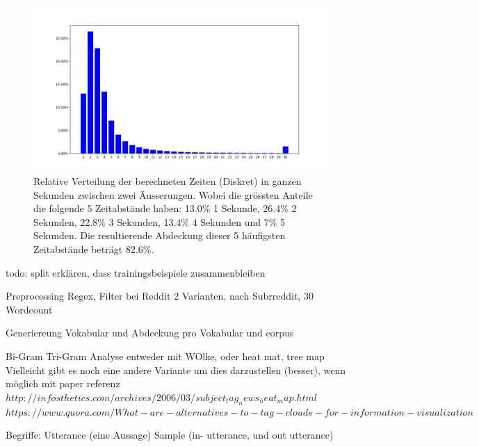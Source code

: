 \begin{figure}[h]
	\label{fig:data:analyse:timediff:opus}
	\centering
	\includegraphics[width=15cm]{img/opus_time_analyze.PNG}
	\caption{Relative Verteilung der berechneten Zeiten (Diskret) in ganzen Sekunden zwischen zwei Äusserungen. Wobei die grössten Anteile die folgende 5 Zeitabstände haben: 13.0\% 1 Sekunde, 26.4\% 2 Sekunden, 22.8\% 3 Sekunden, 13.4\% 4 Sekunden und 7\% 5 Sekunden. Die resultierende Abdeckung dieser 5 häufigsten Zeitabstände beträgt 82.6\%. \protect\footnotemark}
\end{figure}

todo: split erklären, dass trainingsbeispiele zusammenbleiben


Preprocessing
Regex, Filter bei Reddit 2 Varianten, nach Subrreddit, 30 Wordcount


Generiereung Vokabular und Abdeckung pro Vokabular und corpus

Bi-Gram Tri-Gram Analyse entweder mit WOlke, oder heat mat, tree map
Vielleicht gibt es noch eine andere Variante um dies darzustellen (besser), wenn möglich mit paper referenz
$http://infosthetics.com/archives/2006/03/subject_tag_news_heat_map.html$
$https://www.quora.com/What-are-alternatives-to-tag-clouds-for-information-visualization$

Begriffe: Utterance (eine Aussage)
			Sample (in- utterance, und out utterance)
			
